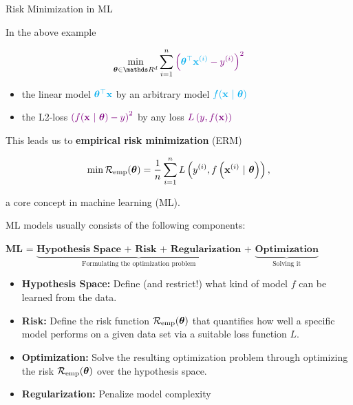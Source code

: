 \begin{vbframe}{Risk Minimization in ML}
	
In the above example

$$
\min_{\thetab \in \R^d} \sum_{i = 1}^n \textcolor{violet}{\left(\textcolor{cyan}{\thetab^\top \xi} - \yi\right)^2}
$$

\begin{itemize}
	\item the linear model $\textcolor{cyan}{\bm{\theta}^\top \mathbf{x}}$ by an arbitrary model $\textcolor{cyan}{f(\mathbf{x} ~|~ \bm{\theta})}$ %
	\item the L2-loss $\textcolor{violet}{\left(f(\mathbf{x} ~|~ \bm{\theta}) - y\right)^2}$ by any loss $\textcolor{violet}{L\left(y, f(\mathbf{x})\right)}$
\end{itemize}

\lz 

This leads us to \textbf{empirical risk minimization} (ERM)

	$$
	\min \mathcal{R}_{\text{emp}}(\bm{\theta}) = \frac{1}{n} \sum\limits_{i=1}^n L\left(y^{(i)}, f\left(\mathbf{x}^{(i)} ~|~ \bm{\theta}\right)\right),
	$$

a core concept in machine learning (ML). 

\framebreak 

ML models usually consists of the following components: 

\begin{center}

  \textbf{ML} = $\underbrace{\textbf{Hypothesis Space + Risk + Regularization}}_{\text{Formulating the optimization problem}}$ + $\underbrace{\textbf{Optimization}}_{\text{Solving it}}$ 
  
\end{center}

\lz

\begin{itemize}

  \item \textbf{Hypothesis Space:} Define (and restrict!) what kind of model 
  $f$ can be learned from the data.
  
  \item \textbf{Risk:} Define the risk function $\mathcal{R}_{\text{emp}}(\bm{\theta})$ that quantifies how well a specific model performs on a given 
  data set via a suitable loss function $L$.
  
  \item \textbf{Optimization:} Solve the resulting optimization problem through optimizing the risk $\mathcal{R}_{\text{emp}}(\bm{\theta})$ over the hypothesis space.

  \item \textbf{Regularization:} Penalize model complexity 
  
\end{itemize}

\end{vbframe}

